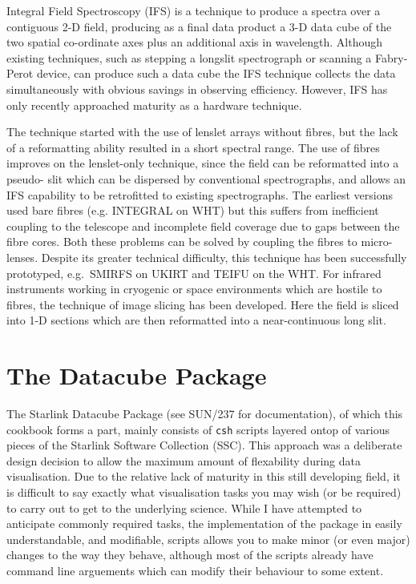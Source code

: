\documentclass[twoside,11pt]{article}
\newcommand{\htmladdnormallink}[2]{#1}
\newcommand{\xref}[3]{#1}
\newcommand{\xlabel}[1]{}
\begin{document}
Integral Field Spectroscopy (IFS) is a technique to produce a spectra over a contiguous 2-D field, producing as a final data product a 3-D data cube of the two spatial co-ordinate axes plus an additional axis in wavelength. Although existing techniques, such as stepping a longslit spectrograph or scanning a Fabry-Perot device, can produce such a data cube the IFS technique collects the data simultaneously with obvious savings in observing efficiency. However, IFS has only recently approached maturity as a hardware technique. 

The technique started with the use of lenslet arrays without fibres, but the lack of a reformatting ability resulted in a short spectral range. The use of fibres improves on the lenslet-only technique, since the field can be reformatted into a pseudo- slit which can be dispersed by conventional spectrographs, and allows an IFS capability to be retrofitted to existing spectrographs. The earliest versions used bare fibres (e.g. INTEGRAL on WHT) but this suffers from inefficient coupling to the telescope and incomplete field coverage due to gaps between the fibre cores. Both these problems can be solved by coupling the fibres to micro-lenses. Despite its greater technical difficulty, this technique has been successfully prototyped, e.g.\ SMIRFS on UKIRT and TEIFU on the WHT. For infrared instruments working in cryogenic or space environments which are hostile to fibres, the technique of image slicing has been developed. Here the field is sliced into 1-D sections which are then reformatted into a near-continuous long slit. 

\section{\xlabel{sc16_datacubepackage}The Datacube Package\label{sc16_datacubepackage}}

The \htmladdnormallink{Starlink}{http://star-www.rl.ac.uk/} Datacube Package (see \xref{SUN/237}{sun237}{} for documentation), of which this cookbook forms a part, mainly consists of {\tt csh} scripts layered ontop of various pieces of the Starlink Software Collection (SSC). This approach was a deliberate design decision to allow the maximum amount of flexability during data visualisation. Due to the relative lack of maturity in this still developing field, it is difficult to say exactly what visualisation tasks you may wish (or be required) to carry out to get to the underlying science. While I have attempted to anticipate commonly required tasks, the implementation of the package in easily understandable, and modifiable, scripts allows you to make minor (or even major) changes to the way they behave, although most of the scripts already have \xref{command line arguements}{sun237}{} which can modify their behaviour to some extent.
\end{document}
